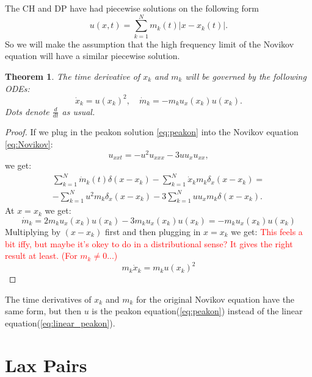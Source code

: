 \documentclass[english,master]{liumaiex}
\theoremstyle{plain}
\newtheorem{theorem}[proposition]{Theorem}
\theoremstyle{definition}
\newcommand\todo[1]{\textcolor{red}{#1}}
\begin{document}
The CH and DP have had piecewise solutions on the following form
\begin{equation} \label{eq:linear_peakon}
	u(x, t) = \sum_{k = 1}^{N} m_k(t) |x - x_k(t)|.
\end{equation}
So we will make the assumption that the high frequency limit of the Novikov equation will have a similar piecewise solution.
\begin{theorem}
	\label{thm:real-spectrum}
	The time derivative of $x_k$ and $m_k$ will be governed by the following ODEs:
	\begin{equation} \label{eq:peakon_odes}
	\dot{x}_k = u(x_k)^2, \quad
	\dot{m}_k = -m_ku_x(x_k)u(x_k).
	\end{equation}
	Dots denote $\frac{d}{dt}$ as usual.
\end{theorem}
\begin{proof}
	If we plug in the peakon solution \eqref{eq:peakon} into the Novikov equation \eqref{eq:Novikov}:
	\begin{equation}
		u_{xxt} = -u^2u_{xxx} - 3uu_xu_{xx},
	\end{equation}
	we get:
	\begin{equation}
	\begin{aligned}
		\sum_{k = 1}^{N} \dot{m}_k(t)\delta(x - x_k) 
		-\sum_{k = 1}^{N}\dot{x}_k m_k\delta_x(x - x_k) =\\
		-\sum_{k = 1}^{N}u^2m_k\delta_x(x - x_k)
		-3\sum_{k = 1}^{N}uu_xm_k\delta(x - x_k).
	\end{aligned}
	\end{equation}
	At $x = x_k$ we get:
	\begin{equation}
		\dot{m}_k =
		2m_ku_x(x_k)u(x_k) -3m_ku_x(x_k)u(x_k) =
		-m_ku_x(x_k)u(x_k)
	\end{equation}
	Multiplying by $(x - x_k)$ first and then plugging in $x = x_k$ we get: \todo{This feels a bit iffy, but maybe it's okey to do in a distributional sense? It gives the right result at least. (For $m_k \ne 0$...)}
	\begin{equation}
		m_k\dot{x}_k = m_k u(x_k)^2
	\end{equation}
\end{proof}
The time derivatives of $x_k$ and $m_k$ for the original Novikov equation have the same form, but then $u$ is the peakon equation(\ref{eq:peakon}) instead of the linear equation(\ref{eq:linear_peakon}).

\section{Lax Pairs}
\end{document}
